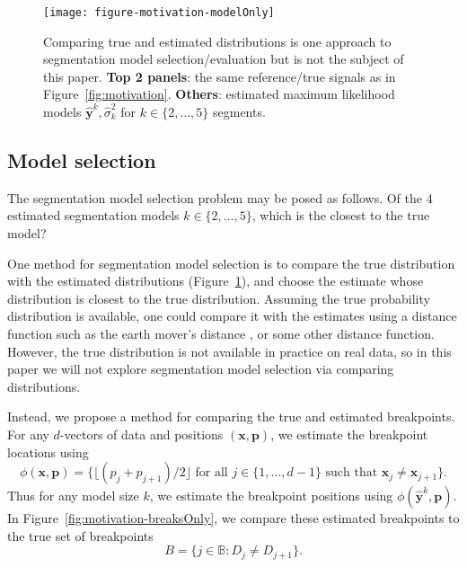 \documentclass{jsfds} %
\begin{document}
\begin{figure}[H]
  \centering
  \texttt{[image: figure-motivation-modelOnly]}
  \vskip -0.5cm
  \caption{Comparing true and estimated distributions is one approach
    to segmentation model selection/evaluation but is not the subject
    of this paper. \textbf{Top 2 panels}: the same reference/true
    signals as in Figure~\ref{fig:motivation}. \textbf{Others}:
    estimated maximum likelihood models $\mathbf{\hat y}^k,\hat
    \sigma^2_k$ for $k\in\{2, \dots, 5\}$ segments.}
  \label{fig:motivation-modelOnly}
\end{figure}

\subsection{Model selection}

The segmentation model selection problem may be posed as follows. Of
the 4 estimated segmentation models $k\in\{2, \dots, 5\}$, which is
the closest to the true model?

\newpage

One method for segmentation model selection is to compare the true
distribution with the estimated distributions
(Figure~\ref{fig:motivation-modelOnly}), and choose the estimate whose
distribution is closest to the true distribution. Assuming the true
probability distribution is available, one could compare it with the
estimates using a distance function such as the earth mover's distance
\citep{earth-mover}, or some other distance function. However, the
true distribution is not available in practice on real data, so in
this paper we will not explore segmentation model selection via
comparing distributions.

Instead, we propose a method for comparing the true and estimated
breakpoints. For any $d$-vectors of data and positions $(\mathbf x,
\mathbf p)$, we estimate the breakpoint locations using
\begin{equation}
  \label{eq:breaks_phi}
\phi(\mathbf{x}, \mathbf p)
= \big\{
\lfloor 
(p_j+p_{j+1})/2
\rfloor
\text{ for all }j\in\{1,\dots,d-1\}\text{ such that }
\mathbf x_j\neq \mathbf x_{j+1}
\big\}.
\end{equation}
Thus for any model size $k$, we estimate the breakpoint positions
using $\phi(\mathbf{\hat y}^k, \mathbf p)$.
In Figure~\ref{fig:motivation-breaksOnly}, we compare
these estimated breakpoints to the true set of breakpoints
\begin{equation}
  \label{eq:breaks_B}
  B = \{j\in\mathbb B:D_j\neq D_{j+1}\}.
\end{equation}
\end{document}
